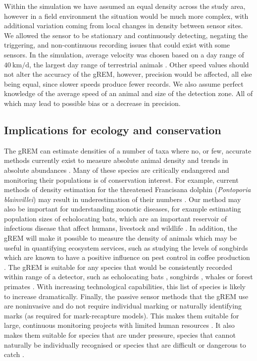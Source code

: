 \documentclass[a4paper,10pt,reqno,oneside]{amsart}
\begin{document}
Within the simulation we have assumed an equal density across the study area, however in a field environment the situation would be much more complex, with additional variation coming from local changes in density between sensor sites. We allowed the sensor to be stationary and continuously detecting, negating the triggering, and non-continuous recording issues that could exist with some sensors. In the simulation, average velocity was chosen based on a
day range of $\SI{40}{\kilo\meter \per \day}$, the largest day range of terrestrial animals \citep{carbone2005far}. Other speed values should not alter the accuracy of the gREM, however, precision would be affected, all else being equal, since slower speeds produce fewer records. We also assume perfect knowledge of the average speed of an animal and size of the detection zone. All of which may lead to possible bias or a decrease in precision. 

\subsection*{Implications for ecology and conservation}
The gREM can estimate densities of a number of taxa where no, or few, accurate methods currently exist to measure absolute animal density and trends in absolute abundances \citep{thomas2012passive}. Many of these species are critically endangered and monitoring their populations is of conservation interest. For example, current methods of density estimation for the threatened Francisana dolphin (\emph{Pontoporia blainvillei}) may result in underestimation of their numbers \citep{crespo2010abundance}. Our method may also be important for understanding zoonotic diseases, for example estimating population sizes of echolocating bats, which are an important reservoir of infectious disease that affect humans, livestock and wildlife \citep{calisher2006bats}. In addition, the gREM will make it possible to measure the density of animals which may be useful in quantifying ecosystem services, such as studying the levels of songbirds which are known to have a positive influence on pest control in coffee production \citep{jirinec2011roosting}. The gREM is suitable for any species that would be consistently recorded within range of a detector, such as echolocating bats \citep{kunz2009methods}, songbirds \citep{buckland2006point}, whales \citep{marques2009estimating} or forest primates \citep{hassel2008reliable}. With increasing technological capabilities, this list of species is likely to increase dramatically. Finally, the passive sensor methods that the gREM use are noninvasive and do not require individual marking \citep{jewell2013effect} or naturally identifying marks (as required for mark-recapture models). This makes them suitable for large, continuous monitoring projects with limited human resources \citep{kelly2012noninvasive}. It also makes them suitable for species that are under pressure, species that cannot naturally be individually recognised or species that are difficult or dangerous to catch \citep{thomas2012passive}.
\end{document}
